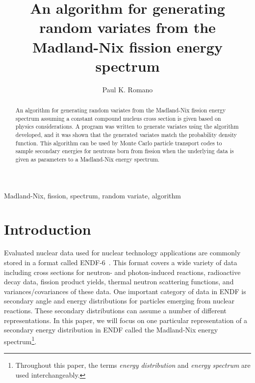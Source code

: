 \documentclass[3p,fleqn]{elsarticle}
\begin{document}
\title{An algorithm for generating random variates from the Madland-Nix fission
  energy spectrum}

\author{Paul K. Romano}

\address{Bechtel Marine Propulsion Corporation, Knolls Atomic Power
  Laboratory \\ P.O. Box 1072, Schenectady, NY 12301, United States}


\begin{abstract}
  An algorithm for generating random variates from the Madland-Nix fission
  energy spectrum assuming a constant compound nucleus cross section is given
  based on physics considerations. A program was written to generate variates
  using the algorithm developed, and it was shown that the generated variates
  match the probability density function. This algorithm can be used by
  Monte Carlo particle transport codes to sample secondary energies for neutrons
  born from fission when the underlying data is given as parameters to a
  Madland-Nix energy spectrum.
\end{abstract}

\begin{keyword}
  Madland-Nix, fission, spectrum, random variate, algorithm
\end{keyword}

\maketitle

\section{Introduction}

Evaluated nuclear data used for nuclear technology applications are commonly
stored in a format called ENDF-6~\cite{bnl-trkov-2012}. This format covers a
wide variety of data including cross sections for neutron- and photon-induced
reactions, radioactive decay data, fission product yields, thermal neutron
scattering functions, and variances/covariances of these data. One important
category of data in ENDF is secondary angle and energy distributions for
particles emerging from nuclear reactions. These secondary distributions can
assume a number of different representations. In this paper, we will focus on
one particular representation of a secondary energy distribution in ENDF called
the Madland-Nix energy spectrum\footnote{Throughout this paper, the terms
  \textit{energy distribution} and \textit{energy spectrum} are used
  interchangeably.}.
\end{document}

